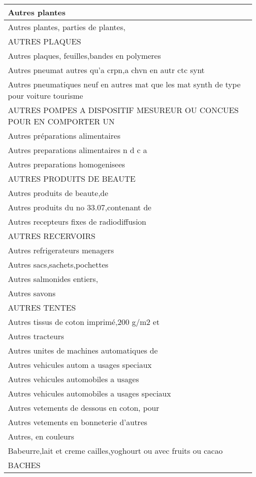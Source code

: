\documentclass[
]{book}
\begin{document}
\begin{table}
\begin{tabular}[t]{l}
\hline
Autres plantes\\
\hline
Autres plantes, parties de plantes,\\
\hline
AUTRES PLAQUES\\
\hline
Autres plaques, feuilles,bandes en polymeres\\
\hline
Autres pneumat autres qu'a crpn,a chvn en autr ctc synt\\
\hline
Autres pneumatiques neuf en autres mat que les mat synth de type pour voiture tourisme\\
\hline
AUTRES POMPES A DISPOSITIF MESUREUR OU CONCUES POUR EN COMPORTER UN\\
\hline
Autres préparations alimentaires\\
\hline
Autres preparations alimentaires n d c a\\
\hline
Autres preparations homogenisees\\
\hline
AUTRES PRODUITS DE BEAUTE\\
\hline
Autres produits de beaute,de\\
\hline
Autres produits du no 33.07,contenant de\\
\hline
Autres recepteurs fixes de radiodiffusion\\
\hline
AUTRES RECERVOIRS\\
\hline
Autres refrigerateurs menagers\\
\hline
Autres sacs,sachets,pochettes\\
\hline
Autres salmonides entiers,\\
\hline
Autres savons\\
\hline
AUTRES TENTES\\
\hline
Autres tissus de coton imprimé,200 g/m2 et\\
\hline
Autres tracteurs\\
\hline
Autres unites de machines automatiques de\\
\hline
Autres vehicules autom a usages speciaux\\
\hline
Autres vehicules automobiles a usages\\
\hline
Autres vehicules automobiles a usages speciaux\\
\hline
Autres vetements de dessous en coton, pour\\
\hline
Autres vetements en bonneterie d'autres\\
\hline
Autres, en couleurs\\
\hline
Babeurre,lait et creme cailles,yoghourt ou avec fruits ou cacao\\
\hline
BACHES\\

\end{tabular}
\end{table}
\end{document}
